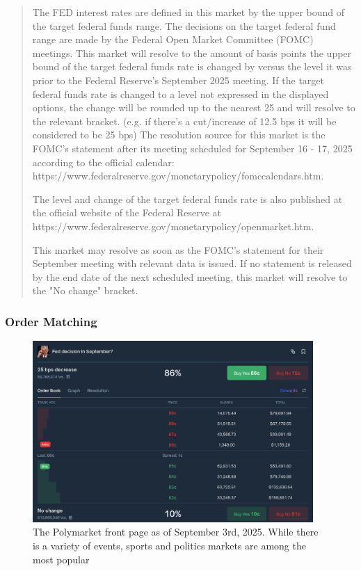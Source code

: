\begin{quote}
  {
    \smaller[1]
    \raggedright
    The FED interest rates are defined in this market by the upper bound of the target federal funds range. The decisions on the target federal fund range are made by the Federal Open Market Committee (FOMC) meetings.
    This market will resolve to the amount of basis points the upper bound of the target federal funds rate is changed by versus the level it was prior to the Federal Reserve's September 2025 meeting.
    If the target federal funds rate is changed to a level not expressed in the displayed options, the change will be rounded up to the nearest 25 and will resolve to the relevant bracket. (e.g. if there's a cut/increase of 12.5 bps it will be considered to be 25 bps)
    The resolution source for this market is the FOMC’s statement after its meeting scheduled for September 16 - 17, 2025 according to the official calendar:
    https://www.federalreserve.gov/monetarypolicy/fomccalendars.htm.

    The level and change of the target federal funds rate is also published at the official website of the Federal Reserve at
    https://www.federalreserve.gov/monetarypolicy/openmarket.htm.

    This market may resolve as soon as the FOMC’s statement for their September meeting with relevant data is issued. If no statement is released by the end date of the next scheduled meeting, this market will resolve to the "No change" bracket.
  }
\end{quote}


\subsubsection{Order Matching}

\begin{figure}[H]
  \begin{center}
    \includegraphics[width=0.95\textwidth]{figures/polymarket_continuous_double_auction_Yes.png}
  \end{center}
  \caption{The Polymarket front page as of September 3rd, 2025. While there is a variety of events, sports and politics markets are among the most popular}
  \label{fig:continuous_double_auction}
\end{figure}

